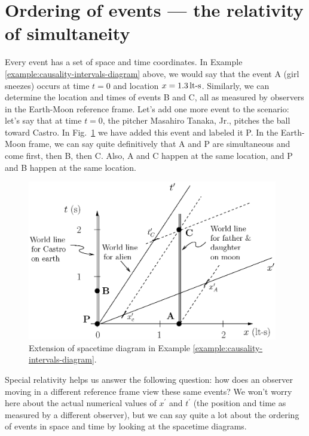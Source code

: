 \section[the relativity of simultaneity]{Ordering of events --- the 
relativity of simultaneity}

Every event has a set of space and time coordinates.  In Example
\ref{example:causality-intervals-diagram} above, we would say that the
event A (girl sneezes) occurs at time $t=0$ and location $x =
1.3\,\mbox{lt-s}$.  Similarly, we can determine the location and times
of events B and C, all as measured by observers in the Earth-Moon
reference frame. Let's add one more event to the scenario: let's say
that at time $t=0$, the pitcher Masahiro Tanaka, Jr., pitches the ball
toward Castro.  In Fig.~\ref{fig:father-daughter} we have added this event and
labeled it P.  In the Earth-Moon frame, we can say quite definitively
that A and P are simultaneous and come first, then B, then C.  Also, A
and C happen at the same location, and P and B happen at the same
location.

\begin{figure}[tbp]
\begin{center}
\includegraphics[width=4.3in]{relativistic_spacetime/worldlines3.eps}
\end{center}
\caption{Extension of spacetime diagram in Example
\ref{example:causality-intervals-diagram}.}
\label{fig:father-daughter}
\end{figure}
    
Special relativity helps us answer the following question: how does an
observer moving in a different reference frame view these same events?  We
won't worry here about the actual numerical values of $x^\prime$ and
$t^\prime$ (the position and time as measured by a different observer), but
we can say quite a lot about the ordering of events in space and time
by looking at the spacetime diagrams.


